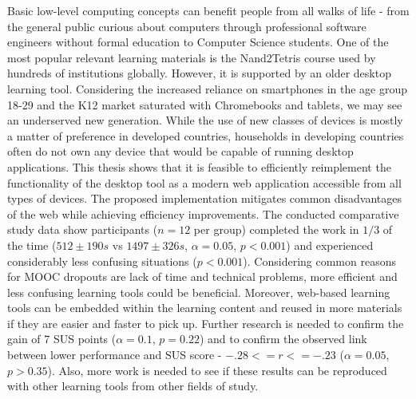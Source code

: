 Basic low-level computing concepts can benefit people from all walks of life - from the general public curious about computers through professional software engineers without formal education to Computer Science students.
One of the most popular relevant learning materials is the Nand2Tetris course used by hundreds of institutions globally.
However, it is supported by an older desktop learning tool.
Considering the increased reliance on smartphones in the age group 18-29 and the K12 market saturated with Chromebooks and tablets, we may see an underserved new generation.
While the use of new classes of devices is mostly a matter of preference in developed countries, households in developing countries often do not own any device that would be capable of running desktop applications.
This thesis shows that it is feasible to efficiently reimplement the functionality of the desktop tool as a modern web application accessible from all types of devices.
The proposed implementation mitigates common disadvantages of the web while achieving efficiency improvements.
The conducted comparative study data show participants ($n=12$ per group) completed the work in $1/3$ of the time ($512 \pm190 s$ vs $1497 \pm326 s$, $\alpha=0.05$, $p<0.001$) and experienced considerably less confusing situations ($p<0.001$).
Considering common reasons for MOOC dropouts are lack of time and technical problems, more efficient and less confusing learning tools could be beneficial.
Moreover, web-based learning tools can be embedded within the learning content and reused in more materials if they are easier and faster to pick up.
Further research is needed to confirm the gain of 7 SUS points ($\alpha=0.1$, $p=0.22$) and to confirm the observed link between lower performance and SUS score - $-.28<=r<=-.23$ ($\alpha=0.05$, $p > 0.35$).
Also, more work is needed to see if these results can be reproduced with other learning tools from other fields of study.

\cleardoublepage
\rhead{\nouppercase{\rightmark}}

\setcounter{page}{1}
